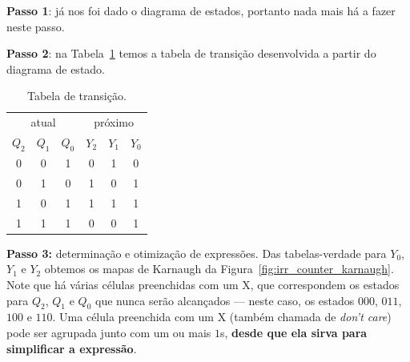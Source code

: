\documentclass[a4paper]{article}
\begin{document}
\textbf{Passo 1}: já nos foi dado o diagrama de estados,
portanto nada mais há a fazer neste passo.

\textbf{Passo 2}: na Tabela~\ref{tab:irr_counter} temos
a tabela de transição desenvolvida a partir do diagrama
de estado.

\begin{table}[!htp]
\begin{center}
\caption{Tabela de transição.}
\label{tab:irr_counter}
\begin{tabular}{|ccc||ccc|}
\hline
\multicolumn{3}{|c||}{atual} & \multicolumn{3}{c|}{próximo} \\
  $Q_2$  &  $Q_1$  &  $Q_0$  &  $Y_2$  &  $Y_1$  &  $Y_0$   \\
\hline
    0    &    0    &    1    &    0    &    1    &    0     \\
    0    &    1    &    0    &    1    &    0    &    1     \\
    1    &    0    &    1    &    1    &    1    &    1     \\
    1    &    1    &    1    &    0    &    0    &    1     \\
\hline
\end{tabular}
\end{center}
\end{table}

\textbf{Passo 3:} determinação e otimização de expressões.
Das tabelas-verdade para $Y_0$, $Y_1$ e $Y_2$ obtemos os
mapas de Karnaugh da Figura~\ref{fig:irr_counter_karnaugh}.
Note que há várias células preenchidas com um X, que
correspondem os estados para $Q_2$, $Q_1$ e $Q_0$ que nunca
serão alcançados --- neste caso, os estados $000$, $011$, $100$ e
$110$. Uma célula preenchida com um X (também
chamada de \emph{don't care}) pode ser agrupada junto com
um ou mais $1$s, \textbf{desde que ela sirva para simplificar a
expressão}.

\def\L{\raisebox{-4pt}}
\end{document}
